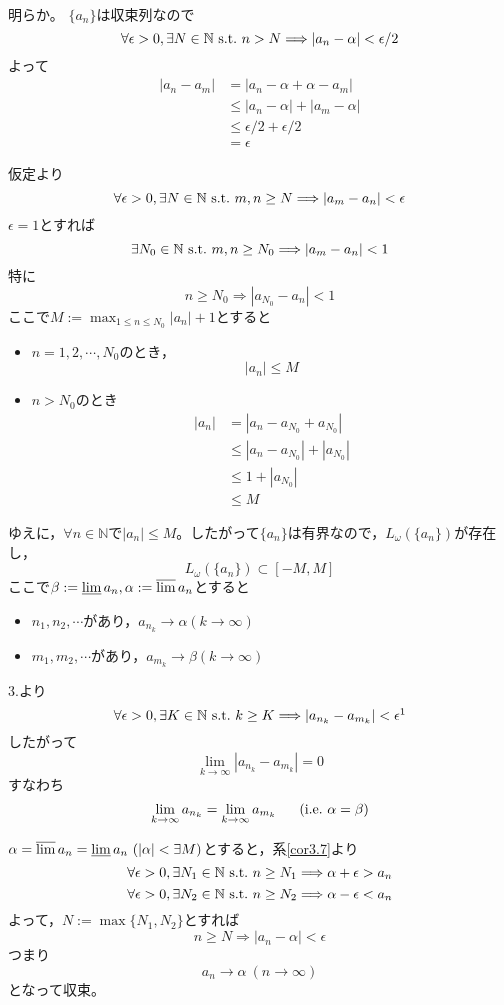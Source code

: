 \documentclass[dvipdfmx,a4j,10pt]{jsarticle}
\makeatletter
\theoremstyle{mystyle1}
\theoremstyle{mystyle2}
\renewenvironment{proof}[1][\proofname]{\par
  \pushQED{\qed}%
  \normalfont
  \topsep6\p@\@plus6\p@ \trivlist
  \item[\hskip\labelsep{\bfseries\sffamily #1}]\ignorespaces
}{%
  \popQED\endtrivlist\@endpefalse
}
\renewcommand\proofname{証明}
\makeatother
\begin{document}
\begin{proof}[定理\ref{thm3.8}の証明]\

\noindent{}
明らか。
$\{a_n\}$は収束列なので
\[\forall\epsilon>0,\exists N\in\mathbb{N}\ {\rm s.t.}\ n>N\Longrightarrow |a_n-\alpha|<\epsilon/2\]
よって
\[
\begin{split}
	|a_n-a_m|&=|a_n-\alpha+\alpha-a_m|\\
	&\leq|a_n-\alpha|+|a_m-\alpha|\\
	&\leq \epsilon/2+\epsilon/2\\
	&=\epsilon
\end{split}
\]

\noindent{}
仮定より
\[\forall\epsilon>0,\exists N\in\mathbb{N}\ {\rm s.t.}\ m,n\geq N\Longrightarrow |a_m-a_n|<\epsilon\]
$\epsilon=1$とすれば
\[\exists N_0\in\mathbb{N}\ {\rm s.t.}\ m,n\geq N_0\Longrightarrow |a_m-a_n|<1\]
特に
\[n\geq N_0\Longrightarrow |a_{N_0}-a_n|<1\]
ここで$\displaystyle M:=\max_{1\leq n \leq N_0}|a_n|+1$とすると
\begin{itemize}
\item $n=1,2,\cdots,N_0$のとき，
\[|a_n|\leq M\]
\item $n>N_0$のとき
\[
\begin{split}
|a_n|&=|a_n-a_{N_0}+a_{N_0}|\\
&\leq |a_n-a_{N_0}|+|a_{N_0}|\\
&\leq 1+|a_{N_0}|\\
&\leq M
\end{split}
\]
\end{itemize}
ゆえに，$\forall n\in\mathbb{N}$で$|a_n|\leq M$。したがって$\{a_n\}$は有界なので，$L_\omega(\{a_n\})$が存在し，
\[L_\omega(\{a_n\})\subset[-M,M]\]
ここで$\beta:=\varliminf a_n,\alpha:=\varlimsup a_n$とすると
\begin{itemize}
\item $n_1,n_2,\cdots$があり，$a_{n_k}\to\alpha(k\to\infty)$
\item $m_1,m_2,\cdots$があり，$a_{m_k}\to\beta(k\to\infty)$
\end{itemize}
3.より
\[\forall\epsilon>0,\exists K\in\mathbb{N}\ {\rm s.t.}\ k\geq K\Longrightarrow |a_{n_k}-a_{m_k}|<\epsilon\footnotemark \]
したがって
\[\lim_{k\to\infty}|a_{n_k}-a_{m_k}|=0\]
すなわち
\[\lim_{k\to\infty} a_{n_k}=\lim_{k\to\infty}a_{m_k}\ \ \ \ \ ({\rm i.e.}\ \alpha=\beta)\]

\noindent{}
$\alpha=\varlimsup a_n=\varliminf a_n\ (|\alpha|<\exists M)$とすると，系\ref{cor3.7}より
\[\forall\epsilon>0,\exists N_1\in\mathbb{N}\ {\rm s.t.}\ n\geq N_1\Longrightarrow \alpha+\epsilon>a_n\]
\[\forall\epsilon>0,\exists N_2\in\mathbb{N}\ {\rm s.t.}\ n\geq N_2\Longrightarrow \alpha-\epsilon<a_n\]
よって，$N:=\max\{N_1,N_2\}$とすれば
\[n\geq N\Longrightarrow |a_n-\alpha|<\epsilon\]
つまり
\[a_n\to\alpha\ (n\to\infty)\]
となって収束。
\end{proof}
\end{document}
